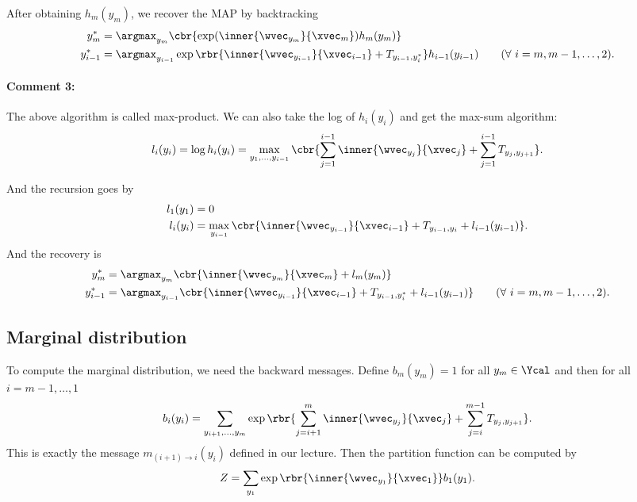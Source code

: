 \documentclass[11pt]{report}
\begin{document}
After obtaining $h_m(y_m)$, we recover the MAP by backtracking
\begin{align}
	y^*_m &= \argmax_{y_m} \cbr{ \exp(\inner{\wvec_{y_m}}{\xvec_m}) h_m(y_m)} \\
	y^*_{i-1} &= \argmax_{y_{i-1}} \exp \rbr{\inner{\wvec_{y_{i-1}}}{\xvec_{i-1}} + T_{y_{i-1}, y^*_i}}  h_{i-1}(y_{i-1})  \qquad (\forall\ i = m, m-1, \ldots, 2).
\end{align}

\paragraph{Comment 3:}
The above algorithm is called max-product.
We can also take the log of $h_i(y_i)$ and get the max-sum algorithm:
\begin{align}
l_i(y_i) = \log h_i(y_i) = \max_{y_1, \ldots, y_{i-1}} \cbr{\sum_{j=1}^{i-1} \inner{\wvec_{y_j}}{\xvec_j} + \sum_{j=1}^{i-1} T_{y_j, y_{j+1}}}.
\end{align}

And the recursion goes by
\begin{align}
  l_1(y_1) &= 0 \\
  l_i(y_i) &= \max_{y_{i-1}} \cbr{\inner{\wvec_{y_{i-1}}}{\xvec_{i-1}} + T_{y_{i-1}, y_i} + l_{i-1}(y_{i-1})}.
\end{align}
And the recovery is
\begin{align}
y^*_m &= \argmax_{y_m} \cbr{ \inner{\wvec_{y_m}}{\xvec_m} + l_m(y_m)} \\
y^*_{i-1} &= \argmax_{y_{i-1}} \cbr{ \inner{\wvec_{y_{i-1}}}{\xvec_{i-1}} + T_{y_{i-1}, y^*_i} + l_{i-1}(y_{i-1})}  \qquad (\forall\ i = m, m-1, \ldots, 2).
\end{align}

\subsection{Marginal distribution}

To compute the marginal distribution, we need the backward messages.
Define $b_m(y_m) = 1$ for all $y_m \in \Ycal$ and then for all $i = m-1, \ldots, 1$
\begin{align}
b_i(y_i) = \sum_{y_{i+1}, \ldots, y_{m}} \exp \rbr{\sum_{j=i+1}^m \inner{\wvec_{y_j}}{\xvec_j} + \sum_{j=i}^{m-1} T_{y_j, y_{j+1}}}.
\end{align}
This is exactly the message $m_{(i+1) \to i} (y_i)$ defined in our lecture.
Then the partition function can be computed by
\begin{align}
  Z = \sum_{y_1} \exp \rbr{\inner{\wvec_{y_1}}{\xvec_1}} b_1(y_1).
\end{align}
\end{document}
